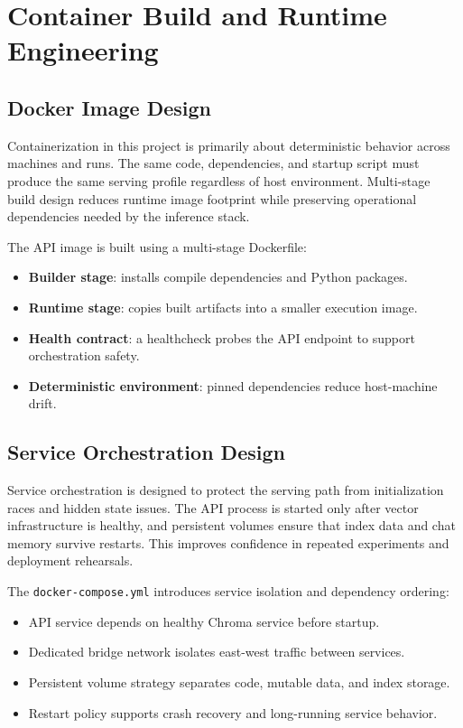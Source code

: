 \documentclass[12pt,letterpaper]{report}
\begin{document}
\section{Container Build and Runtime Engineering}
\subsection{Docker Image Design}
Containerization in this project is primarily about deterministic behavior across machines and runs. The same code, dependencies, and startup script must produce the same serving profile regardless of host environment. Multi-stage build design reduces runtime image footprint while preserving operational dependencies needed by the inference stack.

The API image is built using a multi-stage Dockerfile:
\begin{itemize}
\item \textbf{Builder stage}: installs compile dependencies and Python packages.
\item \textbf{Runtime stage}: copies built artifacts into a smaller execution image.
\item \textbf{Health contract}: a healthcheck probes the API endpoint to support orchestration safety.
\item \textbf{Deterministic environment}: pinned dependencies reduce host-machine drift.
\end{itemize}

\subsection{Service Orchestration Design}
Service orchestration is designed to protect the serving path from initialization races and hidden state issues. The API process is started only after vector infrastructure is healthy, and persistent volumes ensure that index data and chat memory survive restarts. This improves confidence in repeated experiments and deployment rehearsals.

The \texttt{docker-compose.yml} introduces service isolation and dependency ordering:
\begin{itemize}
\item API service depends on healthy Chroma service before startup.
\item Dedicated bridge network isolates east-west traffic between services.
\item Persistent volume strategy separates code, mutable data, and index storage.
\item Restart policy supports crash recovery and long-running service behavior.
\end{itemize}
\end{document}
